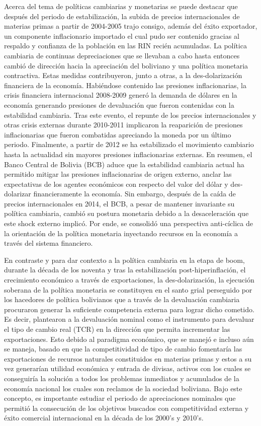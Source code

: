 \documentclass[12pt,letterpaper]{article}
\begin{document}
Acerca del tema de políticas cambiarias y monetarias se puede destacar que después del periodo de estabilización, la subida de precios internacionales de materias primas a partir de 2004-2005 trajo consigo, además del éxito exportador, un componente inflacionario importado el cual pudo ser contenido gracias al respaldo y confianza de la población en las RIN recién acumuladas. La política cambiaria de continuas depreciaciones que se llevaban a cabo hasta entonces cambió de dirección hacia la apreciación del boliviano y una política monetaria contractiva. Estas medidas contribuyeron, junto a otras, a la des-dolarización financiera de la economía. Habiéndose contenido las presiones inflacionarias, la crisis financiera internacional 2008-2009 generó la demanda de dólares en la economía generando presiones de devaluación que fueron contenidas con la estabilidad cambiaria. Tras este evento, el repunte de los precios internacionales y otras crisis externas durante 2010-2011 implicaron la reaparición de presiones inflacionarias que fueron combatidas apreciando la moneda por un último periodo. Finalmente, a partir de 2012 se ha estabilizado el movimiento cambiario hasta la actualidad sin mayores presiones inflacionarias externas. En resumen, el Banco Central de Bolivia (BCB) aduce que la estabilidad cambiaria actual ha permitido mitigar las presiones inflacionarias de origen externo, anclar las expectativas de los agentes económicos con respecto del valor del dólar y des-dolarizar financieramente la economía. Sin embargo, después de la caída de precios internacionales en 2014, el BCB, a pesar de mantener invariante su política cambiaria, cambió su postura monetaria debido a la desaceleración que este shock externo implicó. Por ende, se consolidó una perspectiva anti-cíclica de la orientación de la política monetaria inyectando recursos en la economía a través del sistema financiero.

En contraste y para dar contexto a la política cambiaria en la etapa de boom, durante la década de los noventa y tras la estabilización post-hiperinflación, el crecimiento económico a través de exportaciones, la des-dolarización, la ejecución soberana de la política monetaria se constituyen en el santo grial perseguido por los hacedores de política bolivianos que a través de la devaluación cambiaria procuraron generar la suficiente competencia externa para lograr dicho cometido. Es decir, plantearon a la devaluación nominal como el instrumento para devaluar el tipo de cambio real (TCR) en la dirección que permita incrementar las exportaciones. Esto debido al paradigma económico, que se manejó e incluso aún se maneja, basado en que la competitividad de tipo de cambio fomentaría las exportaciones de recursos naturales constituidos en materias primas y estos a su vez generarían utilidad económica y entrada de divisas, activos con los cuales se conseguiría la solución a todos los problemas inmediatos y acumulados de la economía nacional los cuales son reclamos de la sociedad boliviana. Bajo este concepto, es importante estudiar el periodo de apreciaciones nominales que permitió la consecución de los objetivos buscados con competitividad externa y éxito comercial internacional en la década de los 2000's y 2010's.
\end{document}
